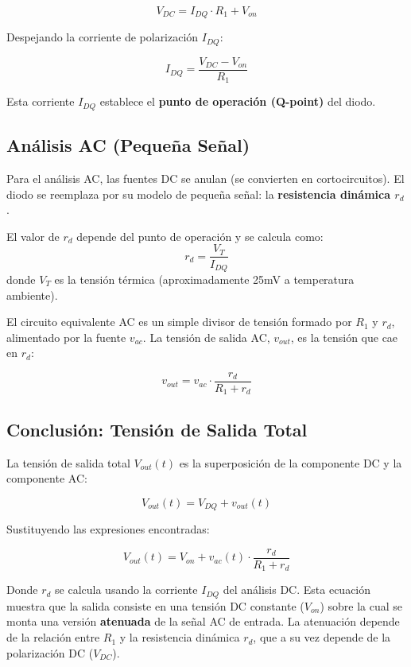 \documentclass[12pt, a4paper]{article}
\begin{document}
\begin{equation}
    V_{DC} = I_{DQ} \cdot R_1 + V_{on}
\end{equation}

Despejando la corriente de polarización $I_{DQ}$:

\begin{equation}
    I_{DQ} = \frac{V_{DC} - V_{on}}{R_1}
\end{equation}

Esta corriente $I_{DQ}$ establece el \textbf{punto de operación (Q-point)} del diodo.

\subsection{Análisis AC (Pequeña Señal)}

Para el análisis AC, las fuentes DC se anulan (se convierten en cortocircuitos). El diodo se reemplaza por su modelo de pequeña señal: la \textbf{resistencia dinámica $r_d$}.

El valor de $r_d$ depende del punto de operación y se calcula como:
\begin{equation}
    r_d = \frac{V_T}{I_{DQ}}
\end{equation}
donde $V_T$ es la tensión térmica (aproximadamente 25mV a temperatura ambiente).

El circuito equivalente AC es un simple divisor de tensión formado por $R_1$ y $r_d$, alimentado por la fuente $v_{ac}$. La tensión de salida AC, $v_{out}$, es la tensión que cae en $r_d$:

\begin{equation}
    v_{out} = v_{ac} \cdot \frac{r_d}{R_1 + r_d}
\end{equation}

\subsection{Conclusión: Tensión de Salida Total}

La tensión de salida total $V_{out}(t)$ es la superposición de la componente DC y la componente AC:

\begin{equation}
    V_{out}(t) = V_{DQ} + v_{out}(t)
\end{equation}

Sustituyendo las expresiones encontradas:

\begin{equation}
    V_{out}(t) = V_{on} + v_{ac}(t) \cdot \frac{r_d}{R_1 + r_d}
\end{equation}

Donde $r_d$ se calcula usando la corriente $I_{DQ}$ del análisis DC. Esta ecuación muestra que la salida consiste en una tensión DC constante ($V_{on}$) sobre la cual se monta una versión \textbf{atenuada} de la señal AC de entrada. La atenuación depende de la relación entre $R_1$ y la resistencia dinámica $r_d$, que a su vez depende de la polarización DC ($V_{DC}$).
\end{document}
